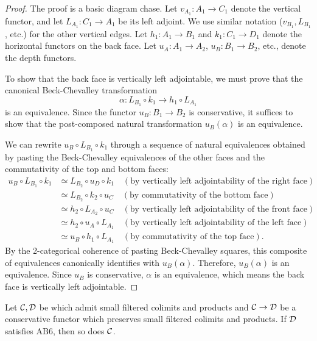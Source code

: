 \documentclass[a4paper,10pt, oneside]{amsart}
\begin{document}
	\begin{proof}
		The proof is a basic diagram chase. Let $v_{A_1}: A_1 \to C_1$ denote the vertical functor, and let $L_{A_1}: C_1 \to A_1$ be its left adjoint. We use similar notation ($v_{B_1}, L_{B_1}$, etc.) for the other vertical edges. Let $h_1: A_1 \to B_1$ and $k_1: C_1 \to D_1$ denote the horizontal functors on the back face. Let $u_A: A_1 \to A_2$, $u_B: B_1 \to B_2$, etc., denote the depth functors.

		To show that the back face is vertically left adjointable, we must prove that the canonical Beck-Chevalley transformation
		$$ \alpha: L_{B_1} \circ k_1 \to h_1 \circ L_{A_1} $$
		is an equivalence. Since the functor $u_B: B_1 \to B_2$ is conservative, it suffices to show that the post-composed natural transformation $u_B(\alpha)$ is an equivalence.
		
		We can rewrite $u_B \circ L_{B_1} \circ k_1$ through a sequence of natural equivalences obtained by pasting the Beck-Chevalley equivalences of the other faces and the commutativity of the top and bottom faces:
		\begin{align*}
			u_B \circ L_{B_1} \circ k_1 &\simeq L_{B_2} \circ u_D \circ k_1 \quad (\text{by vertically left adjointability of the right face}) \\
			&\simeq L_{B_2} \circ k_2 \circ u_C \quad (\text{by commutativity of the bottom face}) \\
			&\simeq h_2 \circ L_{A_2} \circ u_C \quad (\text{by vertically left adjointability of the front face}) \\
			&\simeq h_2 \circ u_A \circ L_{A_1} \quad (\text{by vertically left adjointability of the left face}) \\
			&\simeq u_B \circ h_1 \circ L_{A_1} \quad (\text{by commutativity of the top face}).
		\end{align*}
		By the 2-categorical coherence of pasting Beck-Chevalley squares, this composite of equivalences canonically identifies with $u_B(\alpha)$. Therefore, $u_B(\alpha)$ is an equivalence. Since $u_B$ is conservative, $\alpha$ is an equivalence, which means the back face is vertically left adjointable.
	\end{proof}
	\begin{prop}\label{conserab6}
		Let $\mathcal{C},\mathcal{D}$ be \infcats which admit small filtered colimits and products and $\mathcal{C}\to\mathcal{D}$ be a conservative functor which preserves small filtered colimits and products. If $\mathcal{D}$ satisfies $\mathrm{AB6}$, then so does $\mathcal{C}$.
	\end{prop}
\end{document}
